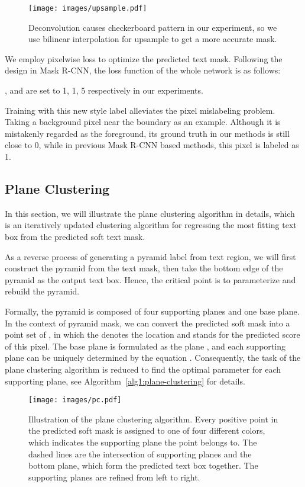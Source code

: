 \documentclass[10pt,twocolumn,letterpaper]{article}
\begin{document}
\begin{figure}
    \texttt{[image: images/upsample.pdf]}
    \vspace{5pt}
    \caption{Deconvolution causes checkerboard pattern in our experiment, so we use bilinear interpolation for upsample to get a more accurate mask.}
    \label{fig:transposed-conv}
\end{figure}

We employ pixelwise  loss to optimize the predicted text mask. Following the design in Mask R-CNN, the loss function of the whole network is as follows:

,  and  are set to 1, 1, 5 respectively in our experiments.


Training with this new style label alleviates the pixel mislabeling problem. Taking a background pixel near the boundary as an example. Although it is mistakenly regarded as the foreground, its ground truth in our methods is still close to 0, while in previous Mask R-CNN based methods, this pixel is labeled as 1.

\subsection{Plane Clustering}\label{subsec:Plane-clustering}
In this section, we will illustrate the plane clustering algorithm in details, which is an iteratively updated clustering algorithm for regressing the most fitting text box from the predicted soft text mask.

As a reverse process of generating a pyramid label from text region, we will first construct the pyramid from the text mask, then take the bottom edge of the pyramid as the output text box. Hence, the critical point is to parameterize and rebuild the pyramid.

Formally, the pyramid is composed of four supporting planes and one base plane. In the context of pyramid mask, we can convert the predicted soft mask into a point set of , in which the  denotes the location and  stands for the predicted score of this pixel. The base plane is formulated as the plane , and each supporting plane can be uniquely determined by the equation  . Consequently, the task of the plane clustering algorithm is reduced to find the optimal parameter  for each supporting plane, see Algorithm~\ref{alg1:plane-clustering} for details.

\begin{figure}
    \texttt{[image: images/pc.pdf]}
    \vspace{5pt}
    \caption{Illustration of the plane clustering algorithm. Every positive point in the predicted soft mask is assigned to one of four different colors, which indicates the supporting plane the point belongs to. The dashed lines are the intersection of supporting planes and the bottom plane, which form the predicted text box together. The supporting planes are refined from left to right.}
    \label{fig:pc}
\end{figure}
\end{document}
